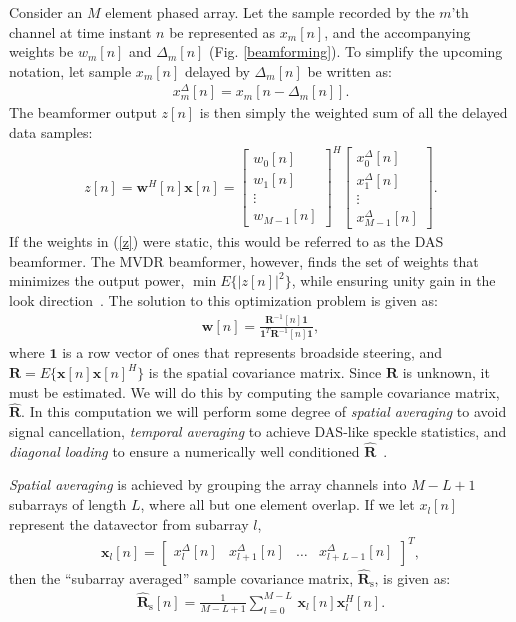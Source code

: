 \documentclass[12pt,journal,captionsoff,onecolumn]{IEEEtran}
\newcommand\bmat[1]{\begin{bmatrix}#1\end{bmatrix}}
\newcommand\sumb[2]{\sum\limits_{#1}^{#2}\,}
\newcommand\T{^{\scriptscriptstyle T}}
\renewcommand\H{^{\scriptscriptstyle H}}
\renewcommand\vec[1]{\boldsymbol{#1}}
\newcommand\mat[1]{\boldsymbol{#1}}
\newcommand\1{\vec 1}
\newcommand*\w{\vec w}
\newcommand*\x{\vec x}
\newcommand*\R{\mat R}
\newcommand*\Ri{\R^{-1}}
\newcommand*\eR{\mat{\hat R}}
\begin{document}
Consider an $M$ element phased array. Let the sample recorded by the $m$'th channel at time instant $n$ be represented as $x_m[n]$, and the accompanying weights be  $w_m[n]$ and $\Delta_m[n]$ (Fig. \ref{beamforming}). To simplify the upcoming notation, let sample $x_m[n]$ delayed by $\Delta_m[n]$ be written as:
\begin{align}
x^\Delta_m[n] = x_m[n-\Delta_m[n]].
\end{align}
The beamformer output $z[n]$ is then simply the weighted sum of all the delayed data samples:
\begin{align}
z[n] = \w\H[n]\x[n] = \bmat{w_0[n]\\w_1[n]\\\vdots\\w_{M-1}[n]}^H \bmat{x^\Delta_0[n]\\x^\Delta_1[n]\\\vdots\\x^\Delta_{M-1}[n]}.\label{z}
\end{align}
If the weights in (\ref{z}) were static, this would be referred to as the \gls{DAS} beamformer. The \gls{MVDR} beamformer, however, finds the set of weights that minimizes the output power, $\min E\{|z[n]|^2\}$, while ensuring unity gain in the look direction~\cite{Capon1969}. The solution to this optimization problem is given as:
\begin{gather}
\vec w[n] = \frac{\Ri[n]\1}{\1\T\Ri[n]\1},\label{weights}
\end{gather}
where $\1$ is a row vector of ones that represents broadside steering, and $\R=E\{\x[n]\x[n]\H\}$ is the spatial covariance matrix. Since $\R$ is unknown, it must be estimated. We will do this by computing the sample covariance matrix, $\eR$. In this computation we will perform some degree of \emph{spatial averaging} to avoid signal cancellation, \emph{temporal averaging} to achieve \gls{DAS}-like speckle statistics, and \emph{diagonal loading} to ensure a numerically well conditioned $\eR$~\cite{Synnevag2009a}.

\emph{Spatial averaging} is achieved by grouping the array channels into $M-L+1$ subarrays of length $L$, where all but one element overlap. If we let $x_l[n]$ represent the datavector from subarray $l$,
\begin{gather}
\x_l[n] = \bmat{x^\Delta_l[n] & x^\Delta_{l+1}[n] & \dots & x^\Delta_{l+L-1}[n]}\T,
\end{gather}
then the ``subarray averaged'' sample covariance matrix, $\eR_\text{s}$, is given as:
\begin{gather}
\eR_\text{s}[n] = \frac{1}{M-L+1} \sumb{l=0}{M-L} \x_l[n]\x_l\H[n].\label{spatialR}
\end{gather}
\end{document}

